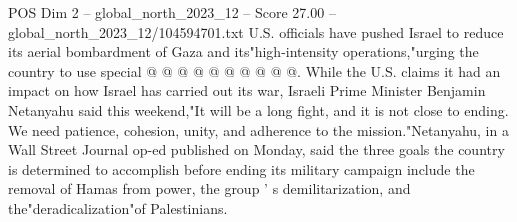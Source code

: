 \begin{textsample}{POS Dim 2 – global\_north\_2023\_12 – Score 27.00 – global\_north\_2023\_12/104594701.txt}
U.S. officials have pushed Israel to reduce its aerial bombardment of Gaza and its"high-intensity operations,"urging the country to use special @ @ @ @ @ @ @ @ @ @.
While the U.S. claims it had an impact on how Israel has carried out its war, Israeli Prime Minister Benjamin Netanyahu said this weekend,"It will be a long fight, and it is not close to ending.
We need patience, cohesion, unity, and adherence to the mission."Netanyahu, in a Wall Street Journal op-ed published on Monday, said the three goals the country is determined to accomplish before ending its military campaign include the removal of Hamas from power, the group ' s demilitarization, and the"deradicalization"of Palestinians.

\end{textsample}
